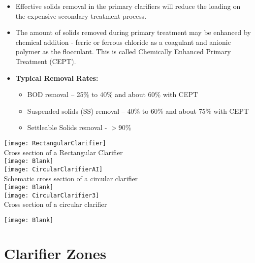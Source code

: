 \begin{itemize}
		\item Effective solids removal in the primary clarifiers will 			reduce the loading on the expensive secondary treatment 				process.
		\item The amount of solids removed during primary treatment 			may be enhanced by chemical addition - ferric or ferrous 				chloride as a coagulant and anionic polymer as the flocculant.  		This is called Chemically Enhanced Primary Treatment (CEPT).
\item \textbf{Typical Removal Rates:}\\
\begin{itemize}
\item \hspace{10mm} BOD removal – 25\% to 40\% and about 60\% with CEPT
\item \hspace{10mm} Suspended solids (SS) removal – 40\% to 60\% and about 75\% with CEPT
\item \hspace{10mm} Settleable Solids removal - $>$90\%
\end{itemize}
\end{itemize}
\clearpage
			\begin{center}
				\texttt{[image: RectangularClarifier]}\\
				Cross section of a Rectangular Clarifier\\

				\texttt{[image: Blank]}\\
				\texttt{[image: CircularClarifierAI]}\\
				Schematic cross section of a circular clarifier\\
				\texttt{[image: Blank]}\\
				\texttt{[image: CircularClarifier3]}\\
				Cross section of a circular clarifier\\
			\end{center}
				\texttt{[image: Blank]}\\


\section{Clarifier Zones}
				
